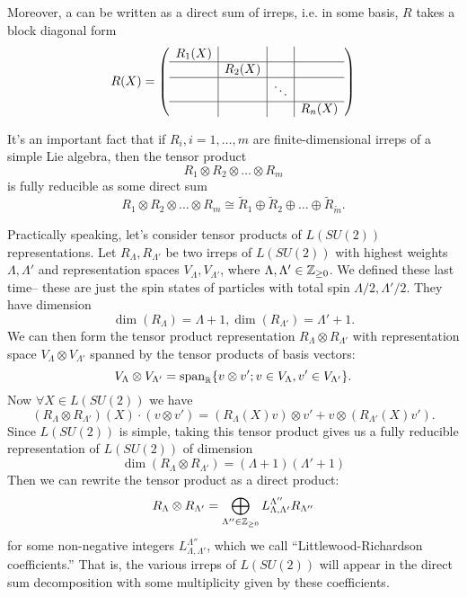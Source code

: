 \begin{defn}
Moreover, a  can be written as a direct sum of irreps, i.e. in some basis, $R$ takes a block diagonal form 
$$
R(X)=
\left(
\begin{array}{c|c|c|c}
R_1(X) &  & & \\
\hline
 & R_2(X) & & \\
\hline
& & \ddots & \\
\hline
& & & R_n(X)
\end{array}
\right)
$$
\end{defn}

It's an important fact that if $R_i, i=1,\ldots, m$ are finite-dimensional irreps of a simple Lie algebra, then the tensor product
$$R_1\otimes R_2 \otimes \ldots \otimes R_m$$ is fully reducible as some direct sum
$$R_1\otimes R_2 \otimes \ldots \otimes R_m\cong \tilde R_1 \oplus \tilde R_2 \oplus \ldots \oplus \tilde R_{\tilde m}.$$

Practically speaking, let's consider tensor products of $L(SU(2))$ representations. Let $R_\Lambda,R_{\Lambda'}$ be two irreps of $L(SU(2))$ with highest weights $\Lambda,\Lambda'$ and representation spaces $V_\Lambda,V_{\Lambda'}$, where $\Lambda,\Lambda' \in \mathbb{Z}_{\geq 0}$. We defined these last time-- these are just the spin states of particles with total spin $\Lambda/2,\Lambda'/2$. They have dimension
$$\dim(R_\Lambda)=\Lambda+1,\dim(R_{\Lambda'})=\Lambda'+1.$$
We can then form the tensor product representation $R_\Lambda \otimes R_{\Lambda'}$ with representation space $V_{\Lambda}\otimes V_{\Lambda'}$ spanned by the tensor products of basis vectors:
%
$$V_{\Lambda}\otimes V_{\Lambda'}=\text{span}_{\mathbb{R}} \{v\otimes v'; v\in V_\Lambda, v'\in V_{\Lambda'}\}.$$
%
Now $\forall X\in L(SU(2))$ we have
%
$$(R_\Lambda \otimes R_{\Lambda'})(X)\cdot (v\otimes v') = (R_\Lambda(X) v)\otimes v'+ v \otimes (R_{\Lambda'}(X)v').$$
%
Since $L(SU(2))$ is simple, taking this tensor product gives us a fully reducible representation of $L(SU(2))$ of dimension
%
$$\dim(R_\Lambda \otimes R_{\Lambda'}) = (\Lambda+1)(\Lambda'+1)$$
%
Then we can rewrite the tensor product as a direct product:
$$R_\Lambda \otimes R_{\Lambda'}=\bigoplus_{\Lambda'' \in \mathbb{Z}_{\geq 0}} L^{\Lambda''}_{\Lambda,\Lambda'}R_{\Lambda''}$$ for some non-negative integers $L^{\Lambda''}_{\Lambda,\Lambda'}$, which we call ``Littlewood-Richardson coefficients.'' That is, the various irreps of $L(SU(2))$ will appear in the direct sum decomposition with some multiplicity given by these coefficients.

